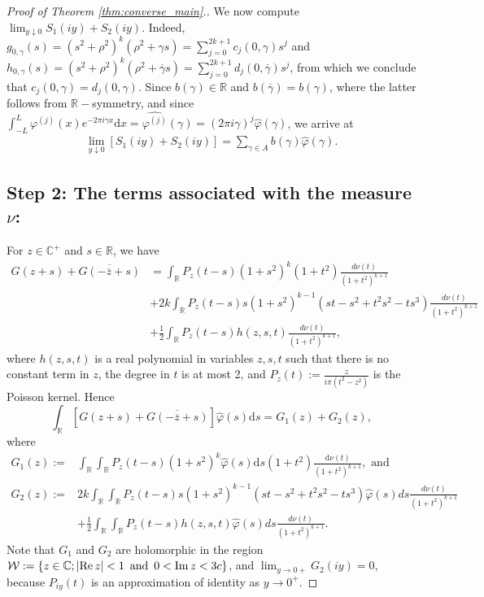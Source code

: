\documentclass[a4paper,reqno,12pt]{amsart}
\newcommand{\W}{\mathcal{W}}
\renewcommand{\r}{\mathbb{R}}
\newcommand{\cp}{\mathbb{C}} %
\newcommand{\ft}{\widehat}
\newcommand{\ga}{\gamma}
\newcommand{\p}{\varphi}
\renewcommand{\d}{\mathrm{d}}
\newcommand{\ov}[1]{\overline{#1}}
\newcommand{\1}{{\bf 1}}
\newcommand{\ra}{\rightarrow}
\renewcommand{\Re}{{\rm Re}\,}
\renewcommand{\Im}{{\rm Im}\,}
\begin{document}
\begin{proof}[Proof of Theorem \ref{thm:converse_main}.]
We now compute $\lim_{y\downarrow0} S_1(iy)+S_2(iy)$. Indeed, $g_{0,\ga}(s)=(s^2+\rho^2)^k(\rho^2+\ga s)=\sum_{j=0}^{2k+1} c_j(0,\ga)s^j$ and $h_{0,\ga}(s)=(s^2+\rho^2)^k(\rho^2+\ov{\ga}s)=\sum_{j=0}^{2k+1} d_j(0,\ov{\ga})s^j$, from which we conclude that $c_j(0,\ga)=d_j(0,\ga)$. Since $b(\ga)\in\r$ and $b(\ov{\ga})=b(\ga)$, where the latter follows from $\r-$symmetry, and since $\int_{-L}^{L} \p^{(j)}(x)e^{-2\pi i\ga x}\d x=\ft{\p^{(j)}}(\ga)=(2\pi i\ga)^j\ft{\p}(\ga)$, we arrive at
\begin{align}
    \lim_{y\downarrow 0} [S_1(iy)+S_2(iy)]=\sum_{\ga\in A} b(\ga)\ft{\p}(\ga).
\end{align}
\subsection*{Step 2: The terms associated with the measure $\nu$:} For $z\in\cp^+$ and $s\in\r$, we have
\begin{align*}
G(z+s)+\ov{G(-\ov{z}+s)}&= \int_{\r} P_z(t-s)(1+s^2)^k(1+t^2)\frac{d\nu(t)}{(1+t^2)^{k+1}}\\
&+2k \int_{\r} P_z(t-s)s(1+s^2)^{k-1}(st-s^2+t^2s^2-ts^3)\frac{d\nu(t)}{(1+t^2)^{k+1}}\\
&+\frac{1}{2} \int_{\r} P_z(t-s)h(z,s,t)\frac{d\nu(t)}{(1+t^2)^{k+1}},
\end{align*}
where $h(z,s,t)$ is a real polynomial in variables $z,s,t$ such that there is no constant term in $z$, the degree in $t$ is at most 2, and $P_z(t):=\frac{z}{i\pi (t^2-z^2)}$ is the Poisson kernel. Hence
\begin{equation}
    \label{eq:contribution_mu}
    \int_{\r} \left[G(z+s)+\ov{G(-\ov{z}+s)}\right]\ft{\p}(s)\d s=G_1(z)+G_2(z), 
\end{equation}
where
\begin{align*}
    G_1(z):=&\int_{\r} \int_{\r} P_z(t-s)(1+s^2)^k\ft{\p}(s)\d s(1+t^2)\frac{\d\nu(t)}{(1+t^2)^{k+1}}, \text{ and }\\
    G_2(z):=&2k \int_{\r} \int_{\r} P_z(t-s)s(1+s^2)^{k-1}(st-s^2+t^2s^2-ts^3)\ft{\varphi}(s)ds\frac{d\nu(t)}{(1+t^2)^{k+1}}\\
    &+\frac{1}{2} \int_{\r} \int_{\r} P_z(t-s)h(z,s,t)\ft{\varphi}(s)ds\frac{d\nu(t)}{(1+t^2)^{k+1}}.
\end{align*}
Note that $G_1$ and $G_2$ are holomorphic in the region  $\W:=\{z\in\cp;|\Re{z}|<1\, \text{ and }\, 0<\Im{z}<3c\}$, and $\lim_{y\ra 0+} G_2(iy)=0$, because $P_{iy}(t)$ is an approximation of identity as $y\ra0^+$.


\end{proof}
\end{document}
